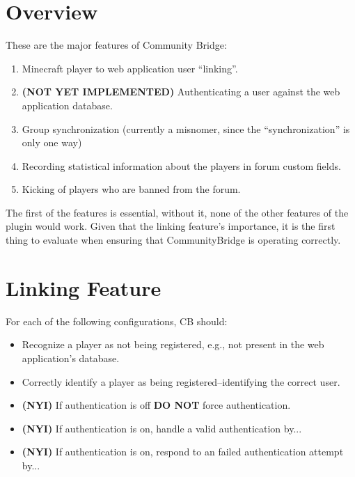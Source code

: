 \documentclass[letterpaper,12pt]{article}
\begin{document}
  \section{Overview}
  These are the major features of Community Bridge:
  \begin{enumerate}
    \item Minecraft player to web application user ``linking''.
    \item {\bf(NOT YET IMPLEMENTED)} Authenticating a user against the web
      application database.
    \item Group synchronization (currently a misnomer, since the
      ``synchronization'' is only one way)
    \item Recording statistical information about the players in forum custom
      fields.
    \item Kicking of players who are banned from the forum.
  \end{enumerate}
  
  The first of the features is essential, without it, none of the other
  features of the plugin would work. Given that the linking feature's
  importance, it is the first thing to evaluate when ensuring that
  CommunityBridge is operating correctly.

  \section{Linking Feature}
  For each of the following configurations, CB should:
  \begin{itemize}
    \item Recognize a player as not being registered, e.g., not present in the
    web application's database.
    \item Correctly identify a player as being registered--identifying the
    correct user.
    \item {\bf (NYI)} If authentication is off {\bf DO NOT} force authentication.
    \item {\bf (NYI)} If authentication is on, handle a valid authentication by...
    \item {\bf (NYI)} If authentication is on, respond to an failed authentication attempt by...
  \end{itemize}
\end{document}

